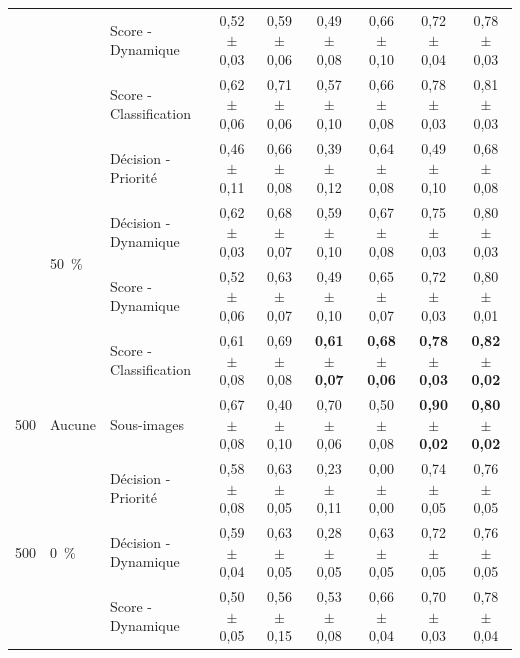 {\begin{landscape}
\begin{table}[p]
\begin{tabular}{lllcccccc}
							        &                               & Score - Dynamique         & 0,52 $\pm$ 0,03         & 0,59 $\pm$ 0,06         & 0,49 $\pm$ 0,08         & 0,66 $\pm$ 0,10         & 0,72 $\pm$ 0,04         & 0,78 $\pm$ 0,03         \\
							        &                               & Score - Classification    & 0,62 $\pm$ 0,06         & 0,71 $\pm$ 0,06         & 0,57 $\pm$ 0,10         & 0,66 $\pm$ 0,08         & 0,78 $\pm$ 0,03         & 0,81 $\pm$ 0,03         \\ \cline{2-9}
							        & \multirow{4}{*}{50~\%}         & Décision - Priorité       & 0,46 $\pm$ 0,11         & 0,66 $\pm$ 0,08         & 0,39 $\pm$ 0,12         & 0,64 $\pm$ 0,08         & 0,49 $\pm$ 0,10         & 0,68 $\pm$ 0,08         \\
							        &                               & Décision - Dynamique      & 0,62 $\pm$ 0,03         & 0,68 $\pm$ 0,07         & 0,59 $\pm$ 0,10         & 0,67 $\pm$ 0,08         & 0,75 $\pm$ 0,03         & 0,80 $\pm$ 0,03         \\
							        &                               & Score - Dynamique         & 0,52 $\pm$ 0,06         & 0,63 $\pm$ 0,07         & 0,49 $\pm$ 0,10         & 0,65 $\pm$ 0,07         & 0,72 $\pm$ 0,03         & 0,80 $\pm$ 0,01         \\ \rowcolor[HTML]{E7E6E6}
		                            &                               & Score - Classification    & 0,61 $\pm$ 0,08         & 0,69 $\pm$ 0,08         & \textbf{0,61 $\pm$ 0,07}& \textbf{0,68 $\pm$ 0,06}& \textbf{0,78 $\pm$ 0,03}& \textbf{0,82 $\pm$ 0,02}\\ \midrule
		500                         & Aucune                        & Sous-images               & 0,67 $\pm$ 0,08         & 0,40 $\pm$ 0,10         & 0,70 $\pm$ 0,06         & 0,50 $\pm$ 0,08         & \textbf{0,90 $\pm$ 0,02}& \textbf{0,80 $\pm$ 0,02}\\ \midrule
		\multirow{12}{*}{500}       & \multirow{4}{*}{0~\%}          & Décision - Priorité       & 0,58 $\pm$ 0,08         & 0,63 $\pm$ 0,05         & 0,23 $\pm$ 0,11         & 0,00 $\pm$ 0,00         & 0,74 $\pm$ 0,05         & 0,76 $\pm$ 0,05         \\
							        &                               & Décision - Dynamique      & 0,59 $\pm$ 0,04         & 0,63 $\pm$ 0,05         & 0,28 $\pm$ 0,05         & 0,63 $\pm$ 0,05         & 0,72 $\pm$ 0,05         & 0,76 $\pm$ 0,05         \\
							        &                               & Score - Dynamique         & 0,50 $\pm$ 0,05         & 0,56 $\pm$ 0,15         & 0,53 $\pm$ 0,08         & 0,66 $\pm$ 0,04         & 0,70 $\pm$ 0,03         & 0,78 $\pm$ 0,04         \\

\end{tabular}
\end{table}
\end{landscape}}
